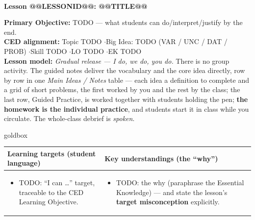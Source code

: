\documentclass[10pt]{article}
\makeatletter
\newcommand{\LessonNumberName}{Lesson @@LESSONID@@: @@TITLE@@}
\makeatother
\begin{document}
\begin{center}
    {\Large\bfseries \CourseName \\
    {\small\bfseries \UnitNumberName \LessonNumberName}}
\end{center}

\begin{tcolorbox}[colback=sky, colframe=navy, boxrule=0.9pt, arc=2mm,
    left=2mm, right=2mm, top=1.5mm, bottom=1.5mm]
    \textbf{Primary Objective:} TODO --- what students can do/interpret/justify by the end.
    \\[2pt]
    \textbf{CED alignment:} Topic TODO \quad$\cdot$\quad Big Idea: TODO (VAR / UNC / DAT / PROB)
    \quad$\cdot$\quad Skill TODO \quad$\cdot$\quad LO TODO \quad$\cdot$\quad EK TODO
    \\[2pt]
    \textbf{Lesson model:} \emph{Gradual release --- I do, we do, you do.} There is no group
    activity. The guided notes deliver the vocabulary and the core idea directly, row by row
    in one \emph{Main Ideas / Notes} table --- each idea a definition to complete and a grid of
    short problems, the first worked by you and the rest by the class; the last row, Guided
    Practice, is worked together with students holding the pen;
    \textbf{the homework is the individual practice}, and students start it in class while you
    circulate. The whole-class debrief is \emph{spoken}.
\end{tcolorbox}

\renewcommand{\arraystretch}{1.4}
\begin{skillbox}{goldbox}
\begin{tabularx}{\linewidth}{@{}X|X@{}}
\textbf{Learning targets (student language)} & \textbf{Key understandings (the ``why'')} \\[2pt]
\hline
\vspace{-6pt}
\begin{itemize}[leftmargin=1.1em, nosep, after=\vspace{2pt}]
  \item TODO: ``I can \dots'' target, traceable to the CED Learning Objective.
\end{itemize}
&
\vspace{-6pt}
\begin{itemize}[leftmargin=1.1em, nosep, after=\vspace{2pt}]
  \item TODO: the why (paraphrase the Essential Knowledge) --- and state the lesson's
        \textbf{target misconception} explicitly.
\end{itemize}
\end{tabularx}
\end{skillbox}
\end{document}
